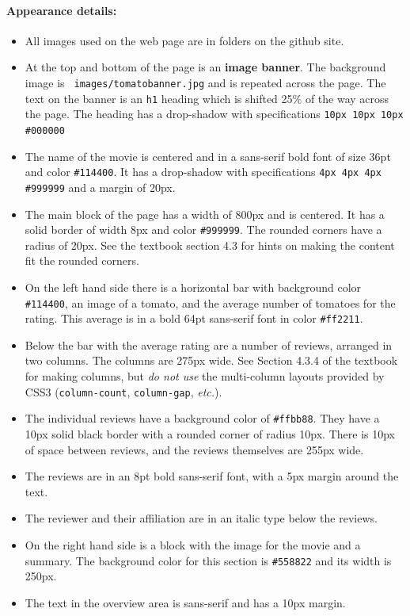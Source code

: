 \documentclass{article}
\begin{document}
\paragraph{Appearance details:}
\begin{itemize}
  \item
All images used on the web page are in folders on the github site.
\item
At the top and bottom of the page is an {\bf image banner}.
 The background image is {\tt
   images/tomatobanner.jpg} and is repeated across the page.
 The text
on the banner is an {\tt h1} heading which is shifted 25\% of the way
across the page.  The heading has a drop-shadow with specifications
\verb|10px 10px 10px #000000|
\item
The name of the movie is centered and in a sans-serif bold font
of size 36pt and color \verb|#114400|.  It has a drop-shadow with
specifications \verb|4px 4px 4px #999999| and a margin of 20px.
\item
The main block of the page has a width of 800px and is centered.
It has a solid border of width 8px and color \verb|#999999|.  The
rounded corners have a radius of 20px.  See the textbook section 4.3
for hints on making the content fit the rounded corners.
\item
On the left hand side there is a horizontal bar with background color
\verb|#114400|, an image of a tomato, and the average number of
tomatoes for the rating.  This average is in a bold 64pt sans-serif
font in color \verb|#ff2211|.
\item
Below the bar with the average rating are a number of reviews,
arranged in two columns.
The columns are 275px wide. See Section 4.3.4 of the textbook for making
columns, but {\em do not use} the multi-column layouts provided by
CSS3 ({\tt column-count}, {\tt column-gap}, {\em etc.}).  
\item
The individual reviews have a background color of \verb|#ffbb88|.
They have a 10px solid black border with a rounded corner of radius
10px. There is 10px of space between reviews, and the reviews
themselves are 255px wide.
\item
The reviews are in an 8pt bold sans-serif font, with a 5px margin
around the text.
\item
The reviewer and their affiliation are in an italic type below the
reviews. 
\item
On the right hand side is a block with the image for the movie and a
summary.  The background color for this section is \verb|#558822| and
its width is 250px.
\item
The text in the overview area is sans-serif and has a 10px margin.
\end{itemize}
\end{document}
